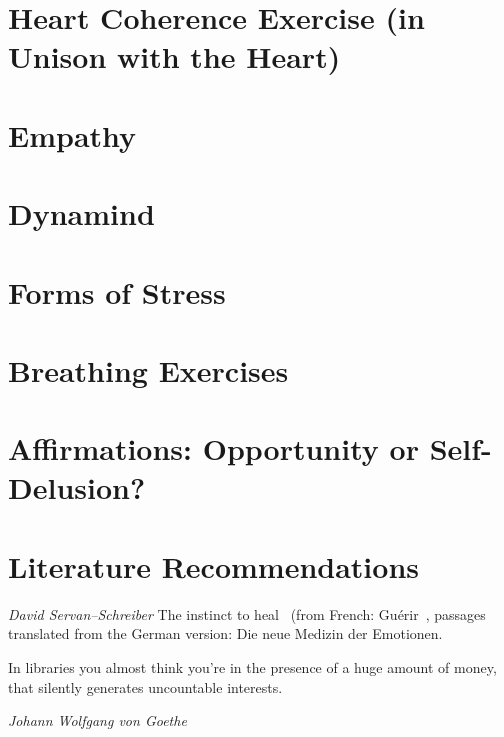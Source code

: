 \documentclass[../main.tex]{subfiles}
\begin{document}
\chapter[Heart Coherence Exercise]{Heart Coherence Exercise (in Unison with the Heart)}


\chapter{Empathy}


\chapter{Dynamind}


\chapter{Forms of Stress}


\chapter{Breathing Exercises}


\chapter[Affirmations]{Affirmations: Opportunity or Self-Delusion?}


\chapter{Literature Recommendations}

\textit{David Servan--Schreiber} The instinct to heal~\cite{InstinctHealDSS} (from French: Gu{{\'e}}rir~\cite{GuerirDSS},
  passages translated from the German version: Die neue Medizin der Emotionen.~\cite{MedEmotionen}

  \epigraph{In libraries you almost think you're in the presence of a huge amount of money, that silently generates uncountable interests.
  }{\textit{Johann Wolfgang von Goethe}}
\end{document}
